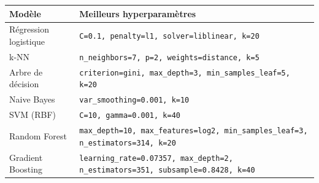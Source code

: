 \begin{tabular}{lp{11cm}}
\toprule
Modèle & Meilleurs hyperparamètres \\
\midrule
Régression logistique & \texttt{C=0.1, penalty=l1, solver=liblinear, k=20} \\
k-NN & \texttt{n\_neighbors=7, p=2, weights=distance, k=5} \\
Arbre de décision & \texttt{criterion=gini, max\_depth=3, min\_samples\_leaf=5, k=20} \\
Naive Bayes & \texttt{var\_smoothing=0.001, k=10} \\
SVM (RBF) & \texttt{C=10, gamma=0.001, k=40} \\
Random Forest & \texttt{max\_depth=10, max\_features=log2, min\_samples\_leaf=3, n\_estimators=314, k=20} \\
Gradient Boosting & \texttt{learning\_rate=0.07357, max\_depth=2, n\_estimators=351, subsample=0.8428, k=40} \\
\bottomrule
\end{tabular}
